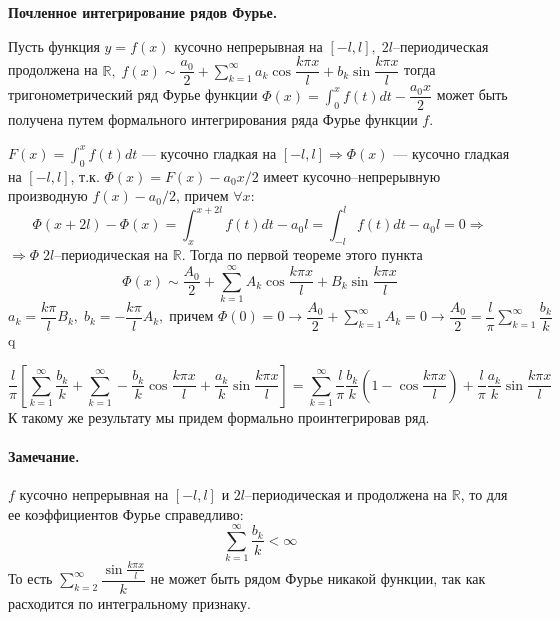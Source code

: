 \textbf{\large Почленное интегрирование рядов Фурье.}
\begin{greyTheorem}
	Пусть функция $ y=f(x) $ кусочно непрерывная на $ [-l,l],\;2l $--периодическая продолжена на $ \mathbb{R},\; f(x) \sim \dfrac{a_0}{2} + \sum_{k=1}^\infty a_k \cos \dfrac{k\pi x}{l} + b_k \sin \dfrac{k\pi x}{l} $ тогда тригонометрический ряд Фурье функции $ \Phi(x) =  \int_{0}^{x} f(t)dt - \dfrac{a_0x}{2} $ может быть получена путем формального интегрирования ряда Фурье функции $ f $.
\end{greyTheorem}
\begin{greyProof}
	$ F(x) = \int_{0}^{x} f(t)dt  $ --- кусочно гладкая на $ [-l,l] \Rightarrow \Phi(x)$ --- кусочно гладкая на $ [-l,l] $, т.к. $ \Phi(x) = F(x) - a_0x/2 $ имеет кусочно--непрерывную производную $ f(x) - a_0/2 $, причем $ \forall x: $
	\[
		\Phi(x+2l) - \Phi(x) = \int_{x}^{x+2l} f(t)dt - a_0l = \int_{-l}^l f(t)dt - a_0l = 0 \Rightarrow
	\]
	$ \Rightarrow \Phi\; 2l$--периодическая на $ \mathbb{R} $. Тогда по первой теореме этого пункта
	\[
		\Phi(x) \sim \dfrac{A_0}{2} + \sum_{k=1}^\infty A_k \cos \dfrac{k\pi x}{l} + B_k \sin \dfrac{k\pi x}{l}
	\]
	$ a_k = \dfrac{k\pi}{l} B_k,\; b_k = - \dfrac{k\pi}{l}A_k,\;\text{причем } \Phi(0)=0 \rightarrow \dfrac{A_0}{2} + \sum_{k=1}^\infty A_k = 0 \rightarrow\dfrac{A_0}{2} = \dfrac{l}{\pi} \sum_{k=1}^\infty \dfrac{b_k}{k} $
q\end{greyProof}
\begin{greyEmpty}
	\[
		\dfrac{l}{\pi} \left[ \sum_{k=1}^{\infty} \dfrac{b_k}{k} + \sum_{k=1}^\infty -\dfrac{b_k}{k}\cos \dfrac{k\pi x}{l} + \dfrac{a_k}{k} \sin \dfrac{k\pi x}{l}  \right] = \sum_{k=1}^\infty \dfrac{l}{\pi} \dfrac{b_k}{k} \left( 1- \cos \dfrac{k\pi x}{l}  \right) + \dfrac{l}{\pi} \dfrac{a_k}{k} \sin \dfrac{k\pi x}{l} 
	\]
	К такому же результату мы придем формально проинтегрировав ряд.
\end{greyEmpty}
\paragraph{Замечание.} $ f $ кусочно непрерывная на $ [-l,l] $ и $ 2l $--периодическая и продолжена на $ \mathbb{R} $, то для ее коэффициентов Фурье справедливо:
\[
	\sum_{k=1}^\infty \dfrac{b_k}{k} < \infty
\]
То есть $ \sum_{k=2}^\infty \dfrac{\sin \frac{k \pi x}{l}}{k} $ не может быть рядом Фурье никакой функции, так как расходится по интегральному признаку.